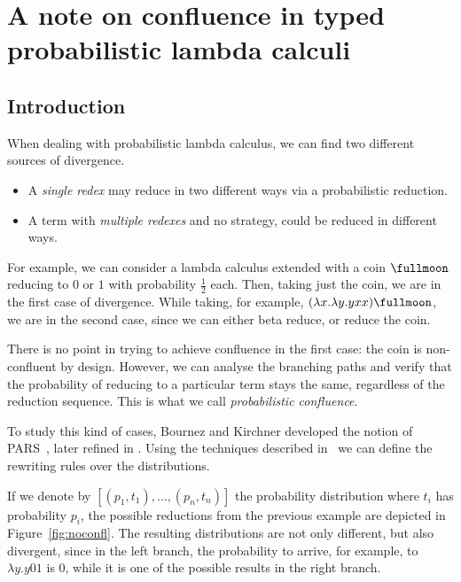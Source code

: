 
\newcommand\coin{\fullmoon}
\newcommand\lambprot{\ensuremath{\lambda_{\circ}}}
\newcommand\lambens{\ensuremath{\lambda_\rho}}
\newcommand\topr[1][1]{\ensuremath{\rightarrow_{#1}}}
\newcommand\ite[3]{\ensuremath{\mathsf{if~}#1\mathsf{~then~}#2\mathsf{~else~}#3}}


\newtheorem{thm}{Theorem}[section]
\newtheorem{lem}[thm]{Lemma}
\newtheorem{cor}[thm]{Corollary}

\theoremstyle{definition}
\newtheorem{defin}[thm]{Definition}

\chapter{A note on confluence in typed probabilistic lambda calculi}

\section{Introduction}

When dealing with probabilistic lambda calculus, we can find two different sources of divergence.
\begin{itemize}
\item A \textit{single redex} may reduce in two different ways via a probabilistic reduction.

\item A term with \textit{multiple redexes} and no strategy, could be reduced in different ways.
\end{itemize}
For example, we can consider a lambda calculus extended with a coin $\coin$ reducing to $0$ or $1$ with probability $\frac 12$ each. Then, taking just the coin, we are in the first case of divergence. While taking, for example, $(\lambda x.\lambda y.yxx)\coin$, we are in the second case, since we can either beta reduce, or reduce the coin.

There is no point in trying to achieve confluence in the first case: the coin is non-confluent by design. However, we can analyse the branching paths and verify that the probability of reducing to a particular term stays the same, regardless of the reduction sequence. This is what we call \textit{probabilistic confluence}.

To study this kind of cases, Bournez and Kirchner developed the notion of PARS~\cite{BK02}, later refined in \cite{BG06}. Using the techniques described in~\cite{DCM17,Faggian} we can define the rewriting rules over the distributions. 

If we denote by $[(p_1,t_1),\dots,(p_n,t_n)]$ the probability distribution where $t_i$ has probability $p_i$, the possible reductions from the previous example are depicted in Figure~\ref{fig:noconfl}. The resulting distributions are not only different, but also divergent, since in the left branch, the probability to arrive, for example, to $\lambda y.y01$ is $0$, while it is one of the possible results in the right branch.

